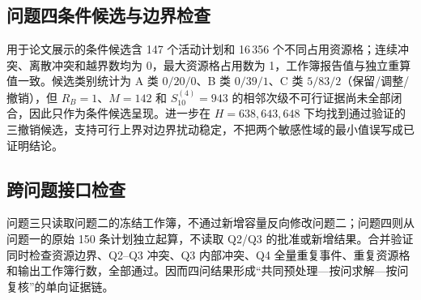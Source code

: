 \subsection{问题四条件候选与边界检查}
用于论文展示的条件候选含 147 个活动计划和 16\,356 个不同占用资源格；连续冲突、离散冲突和越界数均为 0，最大资源格占用数为 1，工作簿报告值与独立重算值一致。候选类别统计为 A 类 $0/20/0$、B 类 $0/39/1$、C 类 $5/83/2$（保留/调整/撤销），但 $R_B=1$、$M=142$ 和 $S_{10}^{(4)}=943$ 的相邻次级不可行证据尚未全部闭合，因此只作为条件候选呈现。进一步在 $H=638,643,648$ 下均找到通过验证的三撤销候选，支持可行上界对边界扰动稳定，不把两个敏感性域的最小值误写成已证明结论。

\subsection{跨问题接口检查}
问题三只读取问题二的冻结工作簿，不通过新增容量反向修改问题二；问题四则从问题一的原始 150 条计划独立起算，不读取 Q2/Q3 的批准或新增结果。合并验证同时检查资源边界、Q2--Q3 冲突、Q3 内部冲突、Q4 全量重复事件、重复资源格和输出工作簿行数，全部通过。因而四问结果形成“共同预处理—按问求解—按问复核”的单向证据链。
